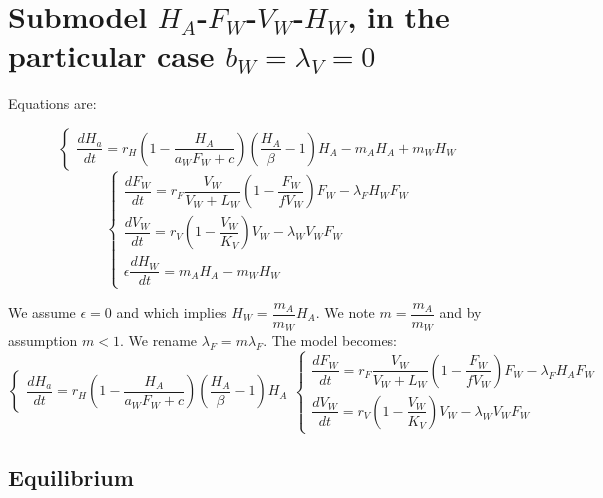 \documentclass{article}
\newcommand{\lfw}{\lambda_{F}}
\newcommand{\lvw}{\lambda_{V}}
\newcommand{\lfv}{\lambda_{W}}
\begin{document}
\section{Submodel $H_A$-$F_W$-$V_W$-$H_W$, in the particular case $b_W = \lvw = 0$}
Equations are:

\begin{equation*}
\left\lbrace \begin{array}{l}
\dfrac{dH_{a}}{dt}=r_{H}\left(1-\dfrac{H_A}{a_{W}F_{W}+c}\right)\left(\dfrac{H_{A}}{\beta}-1\right)H_{A} -m_A H_A + m_W H_W
\end{array} \right.
\end{equation*}
\begin{equation*}
\left\lbrace \begin{array}{l}
\dfrac{dF_W}{dt} = r_F \dfrac{V_W}{V_W + L_W} \left(1 - \dfrac{F_W}{f V_W}\right) F_W - \lfw H_W F_W\\
\dfrac{dV_W}{dt} = r_V \left(1 - \dfrac{V_W}{K_V}\right) V_W - \lfv V_W F_W \\
\epsilon \dfrac{dH_W}{dt} = m_A H_A - m_W H_W
\end{array} \right.
\end{equation*}


We assume $\epsilon = 0$ and which implies $H_W = \dfrac{m_A}{m_W}H_A$. We note $m = \dfrac{m_A}{m_W}$ and by assumption $m < 1$. We rename $\lfw = m \lfw$. The model becomes:
\begin{subequations}
\begin{equation}
\left\lbrace \begin{array}{l}
\dfrac{dH_{a}}{dt}=r_{H}\left(1-\dfrac{H_A}{a_{W}F_{W}+c}\right)\left(\dfrac{H_{A}}{\beta}-1\right)H_{A}
\end{array} \right.
\end{equation}
\begin{equation}
\left\lbrace \begin{array}{l}
\dfrac{dF_W}{dt} = r_F \dfrac{V_W}{V_W + L_W} \left(1 - \dfrac{F_W}{f V_W}\right) F_W - \lfw H_A F_W\\
\dfrac{dV_W}{dt} = r_V \left(1 - \dfrac{V_W}{K_V}\right) V_W - \lfv V_W F_W 
\end{array} \right.
\end{equation}
\label{modelHAFWVWHW, case0}
\end{subequations}



\subsection{Equilibrium}
\end{document}
